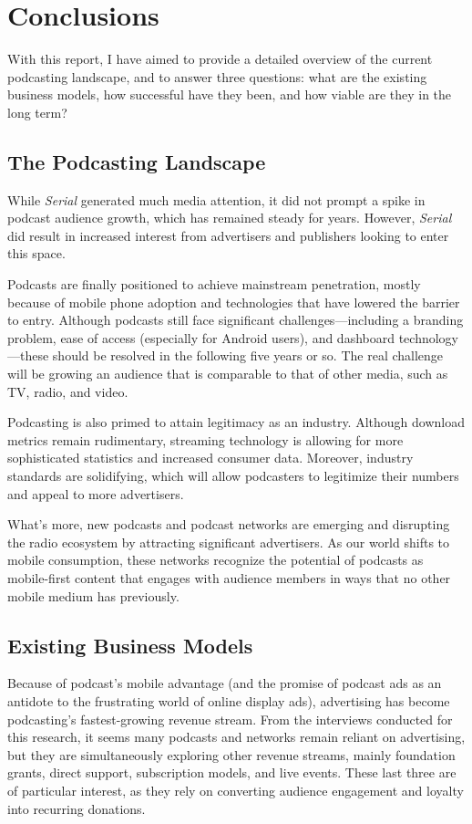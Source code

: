 \documentclass[notoc, symmetric, nobib, nols]{towcenter-guideto-book}
\begin{document}
\chapter{Conclusions}

With this report, I have aimed to provide a detailed overview of the current podcasting landscape, and to answer three questions: what are the existing business models, how successful have they been, and how viable are they in the long term? 

\section{The Podcasting Landscape}

While \textit{Serial} generated much media attention, it did not prompt a spike in podcast audience growth, which has remained steady for years. However, \textit{Serial} did result in increased interest from advertisers and publishers looking to enter this space. 

Podcasts are finally positioned to achieve mainstream penetration, mostly because of mobile phone adoption and technologies that have lowered the barrier to entry. Although podcasts still face significant challenges---including a branding problem, ease of access (especially for Android users), and dashboard technology---these should be resolved in the following five years or so. The real challenge will be growing an audience that is comparable to that of other media, such as TV, radio, and video. 

Podcasting is also primed to attain legitimacy as an industry. Although download metrics remain rudimentary, streaming technology is allowing for more sophisticated statistics and increased consumer data. Moreover, industry standards are solidifying, which will allow podcasters to legitimize their numbers and appeal to more advertisers.  

What's more, new podcasts and podcast networks are emerging and disrupting the radio ecosystem by attracting significant advertisers. As our world shifts to mobile consumption, these networks recognize the potential of podcasts as mobile-first content that engages with audience members in ways that no other mobile medium has previously. 

\section{Existing Business Models}

Because of podcast's mobile advantage (and the promise of podcast ads as an antidote to the frustrating world of online display ads), advertising has become podcasting's fastest-growing revenue stream. From the interviews conducted for this research, it seems many podcasts and networks remain reliant on advertising, but they are simultaneously exploring other revenue streams, mainly foundation grants, direct support, subscription models, and live events. These last three are of particular interest, as they rely on converting audience engagement and loyalty into recurring donations. 
\end{document}
